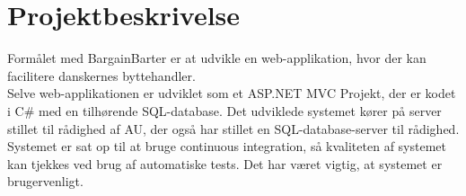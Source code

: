 \chapter{Projektbeskrivelse}\label{ch:Projektbeskrivelse}
Formålet med BargainBarter er at udvikle en web-applikation, hvor der kan facilitere danskernes byttehandler. 
\\ Selve web-applikationen er udviklet som et ASP.NET MVC Projekt, der er kodet i C\# med en tilhørende SQL-database.
Det udviklede systemet kører på server stillet til rådighed af AU, der også har stillet en SQL-database-server til rådighed. 
Systemet er sat op til at bruge continuous integration, så kvaliteten af systemet kan tjekkes ved brug af automatiske tests. Det har været vigtig, at  systemet er  brugervenligt. 



